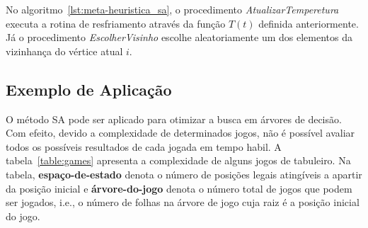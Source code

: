 No algoritmo~\ref{lst:meta-heuristica_sa}, o procedimento \textit{AtualizarTemperetura} executa a
rotina de resfriamento através da função $T(t)$ definida anteriormente. Já o procedimento
\textit{EscolherVisinho} escolhe aleatoriamente um dos elementos da vizinhança do vértice atual $i$.

\subsection{Exemplo de Aplicação}

O método SA pode ser aplicado para otimizar a busca em árvores de decisão.
Com efeito, devido a complexidade de determinados jogos, não é possível
avaliar todos os possíveis resultados de cada jogada em tempo habil. A
tabela~\ref{table:games} apresenta a complexidade de alguns jogos de tabuleiro.
Na tabela, \textbf{espaço-de-estado} denota o número de posições legais
atingíveis a apartir da posição inicial e \textbf{árvore-do-jogo} denota o
número total de jogos que podem ser jogados, i.e., o número de folhas na árvore
de jogo cuja raiz é a posição inicial do jogo.


